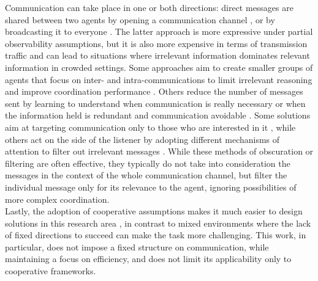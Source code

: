 \documentclass[a4paper,singleside,12pt]{report} %
\begin{document}
Communication can take place in one or both directions: direct messages are shared between two agents by opening a communication channel \cite{Niu2021MultiAgentGC, Zhao2022TargetedMC}, or by broadcasting it to everyone \cite{Kim2021CommunicationIM, Lin2021LearningTG, Sukhbaatar2016LearningMC, Das2018TarMACTM}. The latter approach is more expressive under partial observability assumptions, but it is also more expensive in terms of transmission traffic and can lead to situations where irrelevant information dominates relevant information in crowded settings. Some approaches aim to create smaller groups of agents that focus on inter- and intra-communications to limit irrelevant reasoning and improve coordination performance \cite{Liu2021LearningCF, Niu2021MultiAgentGC, Liu2020When2comMP, Niu2021MultiAgentGC, ATOCJiang2018LearningAC}. Others reduce the number of messages sent by learning to understand when communication is really necessary or when the information held is redundant and communication avoidable \cite{Liu2020When2comMP, Ding2020LearningII}. Some solutions aim at targeting communication only to those who are interested in it \cite{Zhao2022TargetedMC}, while others act on the side of the listener by adopting different mechanisms of attention to filter out irrelevant messages \cite{Li2021LearningED, Kim2021CommunicationIM, Sukhbaatar2016LearningMC, Das2018TarMACTM}. While these methods of obscuration or filtering are often effective, they typically do not take into consideration the messages in the context of the whole communication channel, but filter the individual message only for its relevance to the agent, ignoring possibilities of more complex coordination.\\
Lastly, the adoption of cooperative assumptions makes it much easier to design solutions in this research area \cite{Foerster2017CounterfactualMP, Li2021LearningED, Liu2021LearningCF, Mao2017ACCNetAN, Ding2020LearningII, Sukhbaatar2016LearningMC}, in contrast to mixed environments \cite{Tu2021AdversarialAO, Blumenkamp2020TheEO} where the lack of fixed directions to succeed can make the task more challenging. This work, in particular, does not impose a fixed structure on communication, while maintaining a focus on efficiency, and does not limit its applicability only to cooperative frameworks.
\end{document}
